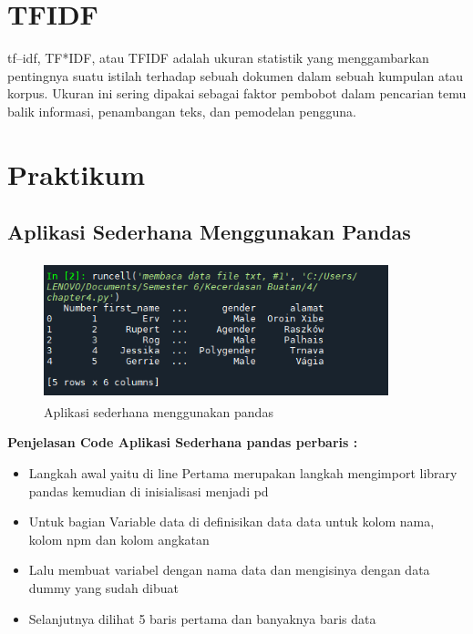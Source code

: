 \section{TFIDF}
tf–idf, TF*IDF, atau TFIDF adalah ukuran statistik yang menggambarkan pentingnya suatu istilah terhadap sebuah dokumen dalam sebuah kumpulan atau korpus. Ukuran ini sering dipakai sebagai faktor pembobot dalam pencarian temu balik informasi, penambangan teks, dan pemodelan pengguna.


\section{Praktikum}
\subsection{Aplikasi Sederhana Menggunakan Pandas}
\begin{figure}[!htbp]
	\centering

	\includegraphics[width=10cm,height=4cm]{figures/Cp4-1.png}
	\caption{Aplikasi sederhana menggunakan pandas}
	\label{penanda}
\end{figure}
\textbf{Penjelasan Code Aplikasi Sederhana pandas perbaris :}
\begin{itemize}
	\item Langkah awal yaitu di line Pertama merupakan langkah mengimport library pandas kemudian di inisialisasi menjadi pd
	\item Untuk bagian Variable data di definisikan data data untuk kolom nama, kolom npm dan kolom angkatan
	\item Lalu membuat variabel dengan nama data dan mengisinya dengan data dummy yang sudah dibuat
	\item Selanjutnya dilihat 5 baris pertama dan banyaknya baris data
\end{itemize}

